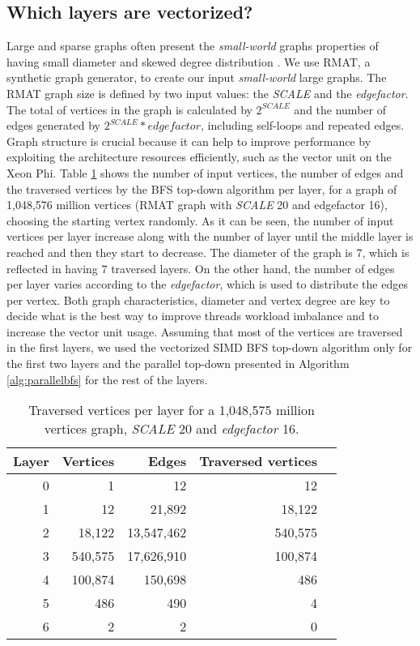 \documentclass{sig-alternate-05-2015}
\begin{document}
\subsection{Which layers are vectorized?}
Large and sparse graphs often present the \textit{small-world} graphs
properties of having small diameter and skewed degree distribution
\cite{RMAT}. We use RMAT, a synthetic graph generator, to create our
input \textit{small-world} large graphs. The RMAT graph size is
defined by two input values: the \textit{SCALE} and the
\textit{edgefactor}. The total of vertices in the graph is calculated
by $2^{SCALE}$ and the number of edges generated by $2^{SCALE} *
edgefactor$, including self-loops and repeated edges. Graph structure
is crucial because it can help to improve performance by exploiting
the architecture resources efficiently, such as the vector unit on the
Xeon Phi. Table \ref{tab:vectorization} shows the number of input
vertices, the number of edges and the traversed vertices by the BFS
top-down algorithm per layer, for a graph of 1,048,576 million
vertices (RMAT graph with \textit{SCALE} 20 and edgefactor 16),
choosing the starting vertex randomly. As it can be seen, the number
of input vertices per layer increase along with the number of layer
until the middle layer is reached and then they start to decrease. The
diameter of the graph is 7, which is reflected in having 7 traversed
layers. On the other hand, the number of edges per layer varies
according to the \textit{edgefactor}, which is used to distribute the
edges per vertex. Both graph characteristics, diameter and vertex
degree are key to decide what is the best way to improve threads
workload imbalance and to increase the vector unit usage. Assuming
that most of the vertices are traversed in the first layers, we used
the vectorized SIMD BFS top-down algorithm only for the first two
layers and the parallel top-down presented in Algorithm
\ref{alg:parallelbfs} for the rest of the layers. 

\begin{table}
\centering
\caption{Traversed vertices per layer for a 1,048,575 million vertices graph, \textit{SCALE} 20 and \textit{edgefactor} 16.}
\label{tab:vectorization}
 \begin{tabular}{|r|r|r|r|r|} 
 \hline
 \textbf{Layer} & \textbf{Vertices}  & \textbf{Edges} & \textbf{Traversed vertices} \\ 
 \hline
0 & 1	&12 & 12\\
1 & 12 &	21,892& 18,122\\
2 & 18,122	&13,547,462& 540,575\\
3 & 540,575 &	17,626,910 & 100,874\\
4 & 100,874 & 150,698 & 486\\
5 & 486	& 490 & 4\\
6 & 2 & 2 & 0 \\
 \hline
\end{tabular}
\vspace{-3mm}
\end{table}
\end{document}
